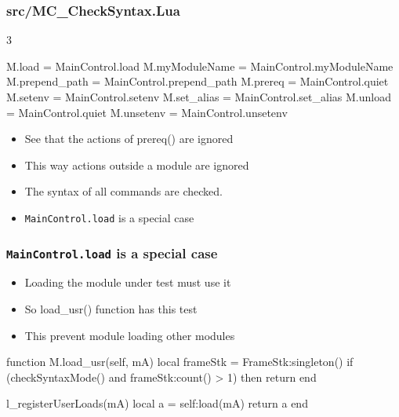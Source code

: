 \documentclass{beamer}
\begin{document}
\begin{frame}[fragile]
    \frametitle{src/MC\_CheckSyntax.Lua}3
 {\tiny
    \begin{semiverbatim}
M.load                 = MainControl.load
M.myModuleName         = MainControl.myModuleName
M.prepend\_path         = MainControl.prepend\_path
M.prereq               = MainControl.quiet
M.setenv               = MainControl.setenv
M.set\_alias            = MainControl.set\_alias
M.unload               = MainControl.quiet
M.unsetenv             = MainControl.unsetenv
    \end{semiverbatim}
}
  \begin{itemize}
    \item See that the actions of prereq() are ignored
    \item This way actions outside a module are ignored
    \item The syntax of all commands are checked.
    \item \texttt{MainControl.load} is a special case
  \end{itemize}

\end{frame}

\begin{frame}[fragile]
    \frametitle{\texttt{MainControl.load} is a special case}
  \begin{itemize}
    \item Loading the module under test must use it
    \item So load\_usr()  function has this test
    \item This prevent module loading other modules
  \end{itemize}
 {\tiny
    \begin{semiverbatim}
function M.load_usr(self, mA)
   local frameStk = FrameStk:singleton()
   if (checkSyntaxMode() and frameStk:count() > 1) then
      return {}
   end

   l_registerUserLoads(mA)
   local a = self:load(mA)
   return a
end
    \end{semiverbatim}
}

\end{frame}
\end{document}
